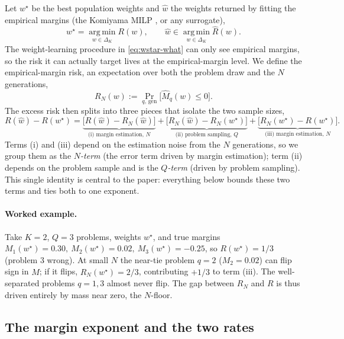 \documentclass{article} %
\providecommand{\argmin}{\mathop{\mathrm{arg\,min}}\limits}
\providecommand{\simplex}{\Delta_K}
\providecommand{\Risk}{R}
\providecommand{\eRisk}{\widehat{R}}
\providecommand{\Mhat}{\widehat{M}}
\providecommand{\what}{\widehat{w}}
\providecommand{\wstar}{w^{\star}}
\begin{document}
Let $\wstar$ be the best population weights and $\what$ the weights returned by
fitting the empirical margins (the Komiyama MILP \citep{komiyama2026best}, or any
surrogate),
\begin{equation}
\label{eq:wstar-what}
\wstar = \argmin_{w\in\simplex}\Risk(w),
\qquad
\what \in \argmin_{w\in\simplex}\eRisk(w).
\end{equation}
The weight-learning procedure in \eqref{eq:wstar-what} can only see empirical
margins, so the risk it can actually target lives at the empirical-margin level.
We define the empirical-margin risk, an expectation over both the problem draw
and the $N$ generations,
\begin{equation}
\label{eq:RN}
\Risk_N(w) := \Pr_{q,\,\text{gen}}\!\big[\Mhat_q(w)\le 0\big].
\end{equation}
The excess risk then splits into three pieces that isolate the two sample sizes,
\begin{equation}
\label{eq:decomp}
\Risk(\what) - \Risk(\wstar)
=
\underbrace{\big[\Risk(\what) - \Risk_N(\what)\big]}_{\text{(i) margin estimation, }N}
+ \underbrace{\big[\Risk_N(\what) - \Risk_N(\wstar)\big]}_{\text{(ii) problem sampling, }Q}
+ \underbrace{\big[\Risk_N(\wstar) - \Risk(\wstar)\big]}_{\text{(iii) margin estimation, }N}.
\end{equation}
Terms (i) and (iii) depend on the estimation noise from the $N$ generations, so
we group them as the \emph{$N$-term} (the error term driven by margin
estimation); term (ii) depends on the problem sample and is the \emph{$Q$-term}
(driven by problem sampling). This single identity is central to the paper:
everything below bounds these two terms and ties both to one exponent.

\paragraph{Worked example.}
Take $K=2$, $Q=3$ problems, weights $\wstar$, and true margins
$M_1(\wstar)=0.30,\ M_2(\wstar)=0.02,\ M_3(\wstar)=-0.25$, so $\Risk(\wstar)=1/3$
(problem $3$ wrong). At small $N$ the near-tie problem $q=2$ ($M_2=0.02$) can flip
sign in $\Mhat$; if it flips, $\Risk_N(\wstar)=2/3$, contributing $+1/3$ to term
(iii). The well-separated problems $q=1,3$ almost never flip. The gap between
$\Risk_N$ and $\Risk$ is thus driven entirely by mass near zero, the $N$-floor.

\subsection{The margin exponent and the two rates}
\label{sec:method-rates}
\end{document}
